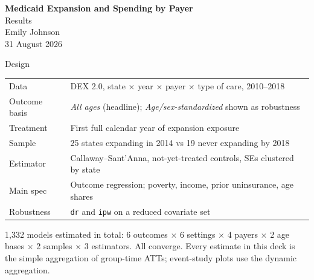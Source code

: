 \documentclass[aspectratio=169,11pt]{beamer}
\begin{document}
{
\begin{frame}[plain]
  \vfill
  \begin{center}
    {\huge\bfseries\color{DeepNavy} Medicaid Expansion and Spending by Payer}\\[0.35cm]
    {\large\color{WarmGray} Results}\\[1.1cm]
    {\normalsize\color{DeepNavy} Emily Johnson}\\[0.15cm]
    {\small\color{WarmGray} 31 August 2026}
  \end{center}
  \vfill
\end{frame}}

\begin{frame}{Design}
  \vspace{0.15cm}
  \begin{center}
  {\normalsize
  \begin{tabular}{@{}l l@{}}
    \toprule
    Data & DEX 2.0, state $\times$ year $\times$ payer $\times$ type of care, 2010--2018 \\
    Outcome basis & \textit{All ages} (headline); \textit{Age/sex-standardized} shown as robustness \\
    Treatment & First full calendar year of expansion exposure \\
    Sample & 25 states expanding in 2014 vs 19 never expanding by 2018 \\
    Estimator & Callaway--Sant'Anna, not-yet-treated controls, SEs clustered by state \\
    Main spec & Outcome regression; poverty, income, prior uninsurance, age shares \\
    Robustness & \texttt{dr} and \texttt{ipw} on a reduced covariate set \\
    \bottomrule
  \end{tabular}}
  \end{center}
  \vspace{0.3cm}
  {\footnotesize\color{WarmGray} 1{,}332 models estimated in total: 6 outcomes $\times$ 6 settings $\times$ 4 payers $\times$ 2 age bases $\times$ 2 samples $\times$ 3 estimators. All converge. Every estimate in this deck is the simple aggregation of group-time ATTs; event-study plots use the dynamic aggregation.}
\end{frame}
\end{document}
